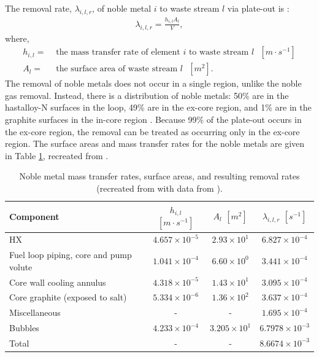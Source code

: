 The removal rate, $\lambda_{i, l, r}$, of noble metal $i$ to waste stream $l$ via plate-out is \cite{lo2022application}:
\begin{align}
    \lambda_{i, l, r} = \frac{h_{i, l} A_l}{V},
    \label{eq:rem-plateout}
\end{align}
where,
\begin{align}
    h_{i, l} =& \text{ the mass transfer rate of element $i$ to waste stream $l$ $[m \cdot s^{-1}]$} \nonumber \\
    A_l =& \text{ the surface area of waste stream $l$ $[m^2]$.} \nonumber
\end{align}
The removal of noble metals does not occur in a single region, unlike the noble gas removal.
Instead, there is a distribution of noble metals: 50\% are in the hastalloy-N surfaces in the loop, 49\% are in the ex-core region, and 1\% are in the graphite surfaces in the in-core region \cite{kedl1972migration}.
Because 99\% of the plate-out occurs in the ex-core region, the removal can be treated as occurring only in the ex-core region.
The surface areas and mass transfer rates for the noble metals are given in Table \ref{tab:noblemetals}, recreated from \cite{lo2022application}.

\begin{table}[H]
    \centering
    \caption{Noble metal mass transfer rates, surface areas, and resulting removal rates (recreated from \cite{lo2022application} with data from \cite{kedl1972migration}).}
    \begin{tabular}{lccc}
        \hline
        Component & $h_{i, l}$ $[m \cdot s^{-1}]$ & $A_l$ $[m^2]$ & $\lambda_{i, l, r}$ $[s^{-1}]$ \\
        \hline
        HX & $4.657 \times 10^{-5}$ & $2.93 \times 10^1$ & $6.827 \times 10^{-4}$ \\
        Fuel loop piping, core and pump volute & $1.041 \times 10^{-4}$ & $6.60 \times 10^0$ & $3.441 \times 10^{-4}$ \\
        Core wall cooling annulus & $4.318 \times 10^{-5}$ & $1.43 \times 10^1$ & $3.095 \times 10^{-4}$ \\
        Core graphite (exposed to salt) & $5.334 \times 10^{-6}$ & $1.36 \times 10^2$ & $3.637 \times 10^{-4}$ \\
        Miscellaneous & - & - & $1.695 \times 10^{-4}$ \\
        Bubbles & $4.233 \times 10^{-4}$ & $3.205 \times 10^1$ & $6.7978 \times 10^{-3}$ \\
        \hline
        Total & - & - & $8.6674 \times 10^{-3}$ \\
    \end{tabular}
    \label{tab:noblemetals}
\end{table}





